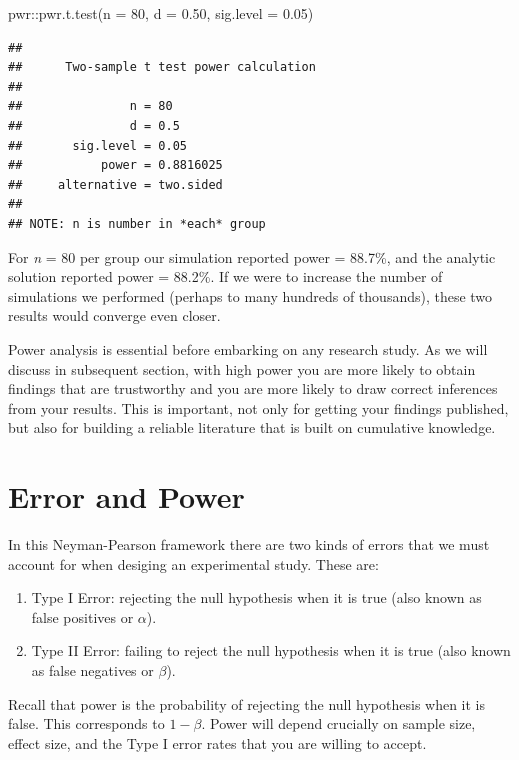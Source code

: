 \documentclass[
]{book}
\newenvironment{Shaded}{\begin{snugshade}}{\end{snugshade}}
\newcommand{\AttributeTok}[1]{\textcolor[rgb]{0.77,0.63,0.00}{#1}}
\newcommand{\DecValTok}[1]{\textcolor[rgb]{0.00,0.00,0.81}{#1}}
\newcommand{\FloatTok}[1]{\textcolor[rgb]{0.00,0.00,0.81}{#1}}
\newcommand{\FunctionTok}[1]{\textcolor[rgb]{0.00,0.00,0.00}{#1}}
\newcommand{\NormalTok}[1]{#1}
\newcommand{\SpecialCharTok}[1]{\textcolor[rgb]{0.00,0.00,0.00}{#1}}
\begin{document}
\begin{Shaded}
\begin{Highlighting}[]
\NormalTok{pwr}\SpecialCharTok{::}\FunctionTok{pwr.t.test}\NormalTok{(}\AttributeTok{n =} \DecValTok{80}\NormalTok{, }\AttributeTok{d =} \FloatTok{0.50}\NormalTok{, }\AttributeTok{sig.level =} \FloatTok{0.05}\NormalTok{)}
\end{Highlighting}
\end{Shaded}

\begin{verbatim}
## 
##      Two-sample t test power calculation 
## 
##               n = 80
##               d = 0.5
##       sig.level = 0.05
##           power = 0.8816025
##     alternative = two.sided
## 
## NOTE: n is number in *each* group
\end{verbatim}

For \emph{n} = 80 per group our simulation reported power = 88.7\%, and the analytic solution reported power = 88.2\%. If we were to increase the number of simulations we performed (perhaps to many hundreds of thousands), these two results would converge even closer.

Power analysis is essential before embarking on any research study. As we will discuss in subsequent section, with high power you are more likely to obtain findings that are trustworthy and you are more likely to draw correct inferences from your results. This is important, not only for getting your findings published, but also for building a reliable literature that is built on cumulative knowledge.

\hypertarget{error-and-power}{%
\section{Error and Power}\label{error-and-power}}

In this Neyman-Pearson framework there are two kinds of errors that we must account for when desiging an experimental study. These are:

\begin{enumerate}
\def\labelenumi{\arabic{enumi}.}
\item
  Type I Error: rejecting the null hypothesis when it is true (also known as false positives or \(\alpha\)).
\item
  Type II Error: failing to reject the null hypothesis when it is true (also known as false negatives or \(\beta\)).
\end{enumerate}

Recall that power is the probability of rejecting the null hypothesis when it is false. This corresponds to \(1-\beta\). Power will depend crucially on sample size, effect size, and the Type I error rates that you are willing to accept.
\end{document}
